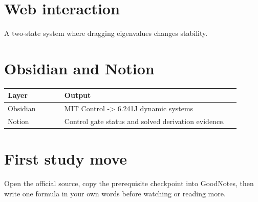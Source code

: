 \documentclass[11pt]{article}
\begin{document}
\section*{Web interaction}
A two-state system where dragging eigenvalues changes stability.

\section*{Obsidian and Notion}
\begin{tabular}{p{0.22\linewidth}p{0.68\linewidth}}
\toprule
Layer & Output \\
\midrule
Obsidian & MIT Control -> 6.241J dynamic systems \\
Notion & Control gate status and solved derivation evidence. \\
\bottomrule
\end{tabular}

\section*{First study move}
Open the official source, copy the prerequisite checkpoint into GoodNotes, then write one formula in your own words before watching or reading more.
\end{document}
